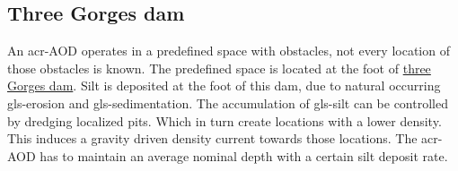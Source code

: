 \subsection{Three Gorges dam}\label{sec:usecase3}
An \gls{acr-AOD} operates in a predefined space with obstacles, not every location of those obstacles is known. The predefined space is located at the foot of \href{https://www.google.nl/maps/place/Three+Gorges+Dam/@30.8263416,111.0118356,16z/data=!4m2!3m1!1s0x368476d5e9a340d9:0xa017b4d524bd9d6c}{three Gorges dam}. Silt is deposited at the foot of this dam, due to natural occurring \gls{gls-erosion} and \gls{gls-sedimentation}. The accumulation of \gls{gls-silt} can be controlled by dredging localized pits. Which in turn create locations with a lower density. This induces a gravity driven density current towards those locations. The \gls{acr-AOD} has to maintain an average nominal depth with a certain silt deposit rate.
